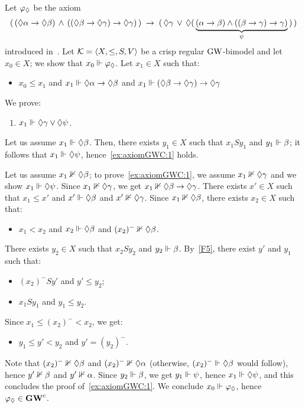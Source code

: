  
\begin{example}\label{ex:axiomGWC2}

Let $\varphi_\lozenge$ be the axiom 
  \[
    (\,(\lozenge\alpha\to\lozenge\beta)\,\land\,((\lozenge\beta\to\lozenge\gamma)\to\lozenge\gamma)\,)\;\to\;
    (\, \lozenge\gamma\,\lor\,\lozenge(\,\underbrace{(\alpha\to\beta)\land((\beta\to\gamma)\to\gamma)}_\psi \,)   \,)
  \]
introduced in~\cite{VidalR:26}.
Let  $\mathcal{K}=\langle X,\leq,S,V \rangle$ be  a crisp regular  $\mbox{$\mathrm{GW}$}$-bimodel and let $x_0\in X$;
we show that $x_0\Vdash \varphi_\lozenge$.
Let $x_1\in X$ such that:
\begin{itemize}
\item $x_0\leq x_1$ and  $x_1\Vdash   \lozenge\alpha\to\lozenge\beta$ and   $x_1\Vdash (\lozenge\beta\to\lozenge\gamma)\to\lozenge\gamma$
\end{itemize}
We prove:
\begin{enumerate}[label=(\alph*), ref=(\alph*),leftmargin=*]
\item\label{ex:axiomGWC:1}
$x_1\Vdash \lozenge \gamma\lor\lozenge \psi$.  
\end{enumerate}
Let us assume  $x_1\Vdash \lozenge\beta$.
Then, there exists $y_1\in X$ such that $x_1 S y_1$ and $y_1\Vdash \beta$;
it follows that $x_1\Vdash \lozenge \psi$, hence~\ref{ex:axiomGWC:1} holds.

Let us assume  $x_1\nVdash \lozenge\beta$; to prove~\ref{ex:axiomGWC:1},
we assume
$x_1\nVdash \lozenge \gamma$ and we show $x_1\Vdash \lozenge \psi$.
Since $x_1\nVdash \lozenge \gamma$, we get   $x_1\nVdash \lozenge\beta\to\lozenge\gamma$.
There exists $x'\in X$ such that $x_1\leq x'$ and $x'\Vdash  \lozenge\beta$ and
$x'\nVdash \lozenge\gamma$. Since  $x_1\nVdash\lozenge \beta$, there exists $x_2\in X$ such that:
\begin{itemize}
\item $x_1 < x_2$ and  $x_2\Vdash \lozenge\beta$ and $(x_2)^-\nVdash \lozenge \beta$.
\end{itemize}
There exists $y_2\in X$ such that $x_2 S y_2$ and $y_2\Vdash\beta$. 
By~\ref{F5}, there exist   $y'$ and $y_1$ such that:
\begin{itemize}
\item $(x_2)^- S y'$ and $y'\leq y_2$;

\item $x_1 S y_1$ and $y_1\leq y_2$.
\end{itemize}
Since $x_1\leq (x_2)^- < x_2$, we get:
\begin{itemize}
\item
  $y_1\leq y'< y_2$ and $y'=(y_2)^-$.  
\end{itemize}
Note that  $(x_2)^-\nVdash \lozenge \beta$  and   $(x_2)^-\nVdash \lozenge \alpha$ (otherwise,  $(x_2)^-\Vdash \lozenge \beta$ would follow),
hence $y'\nVdash \beta$ and  $y'\nVdash \alpha$.
Since $y_2\Vdash \beta$, we get $y_1\Vdash \psi$, hence $x_1\Vdash \lozenge \psi$,
and this concludes the proof of~\ref{ex:axiomGWC:1}.
We  conclude  $x_0\Vdash \varphi_\lozenge$,
hence $\varphi_\lozenge\in\mathbf{GW}^\mathrm{c}$. \EndEx
 \end{example} 


